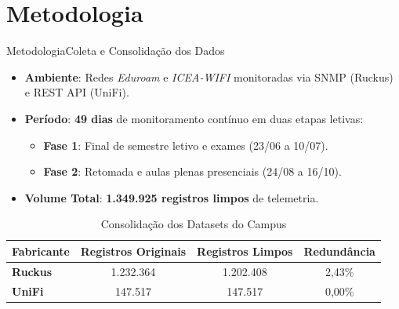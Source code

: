 \documentclass[10pt,brazil]{beamer}
\begin{document}
    \section{Metodologia}
    \begin{frame}{Metodologia}{Coleta e Consolidação dos Dados}
        \begin{itemize}
            \item \textbf{Ambiente}: Redes \textit{Eduroam} e \textit{ICEA-WIFI} monitoradas via SNMP (Ruckus) e REST API (UniFi).
            \item \textbf{Período}: \textbf{49 dias} de monitoramento contínuo em duas etapas letivas:
            \begin{itemize}
                \item \textbf{Fase 1}: Final de semestre letivo e exames (23/06 a 10/07).
                \item \textbf{Fase 2}: Retomada e aulas plenas presenciais (24/08 a 16/10).
            \end{itemize}
            \item \textbf{Volume Total}: \textbf{1.349.925 registros limpos} de telemetria.
        \end{itemize}
        \vspace{0.1cm}
        \begin{table}[h]
            \centering\footnotesize
            \begin{tabular}{lccc}
                \hline
                \textbf{Fabricante} & \textbf{Registros Originais} & \textbf{Registros Limpos} & \textbf{Redundância} \\
                \hline
                \textbf{Ruckus} & 1.232.364 & 1.202.408 & 2,43\% \\
                \textbf{UniFi}  & 147.517   & 147.517   & 0,00\% \\
                \hline
            \end{tabular}
            \caption{Consolidação dos Datasets do Campus}
            \label{tab:resumo_coleta_slides}
        \end{table}
    \end{frame}
\end{document}
